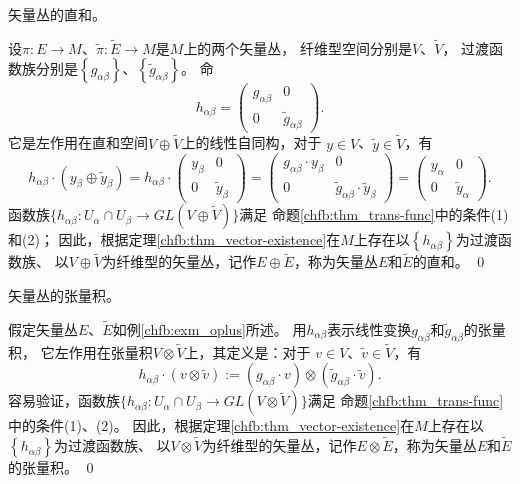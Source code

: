 \begin{example}\label{chfb:exm_oplus}
    矢量丛的直和。
\end{example}
设$\pi: E \rightarrow M$、$\tilde{\pi}: \widetilde{E} \rightarrow M$是$M$上的两个矢量丛，
纤维型空间分别是$V$、$\tilde{V}$，
过渡函数族分别是$\left\{g_{\alpha \beta}\right\}$、$\left\{\tilde{g}_{\alpha \beta}\right\}$。 命
\begin{equation*}
    h_{\alpha \beta}=\begin{pmatrix}
        g_{\alpha \beta} & 0 \\ 0 & \tilde{g}_{\alpha \beta}
    \end{pmatrix}.
\end{equation*}
它是左作用在直和空间$V \oplus \tilde{V}$上的线性自同构，对于 $y \in V$、$ \tilde{y} \in \tilde{V}$，有
\begin{equation*}
    h_{\alpha \beta} \cdot (y_\beta \oplus \tilde{y}_\beta)
    =h_{\alpha \beta} \cdot \begin{pmatrix}
        y_{\beta} & 0 \\ 0 & \tilde{y}_{\beta}
    \end{pmatrix}
    =\begin{pmatrix}
        g_{\alpha \beta}\cdot  y_{\beta} & 0 \\ 0 & \tilde{g}_{\alpha \beta}\cdot  \tilde{y}_{\beta}
    \end{pmatrix}
    =\begin{pmatrix}
        y_{\alpha} & 0 \\ 0 & \tilde{y}_{\alpha}
    \end{pmatrix} .
\end{equation*}
函数族$\{h_{\alpha \beta}: U_\alpha \cap U_\beta \rightarrow GL(V \oplus \tilde{V})\}$满足
命题\ref{chfb:thm_trans-func}中的条件(1)和(2)；
因此，根据定理\ref{chfb:thm_vector-existence}在$M$上存在以$\left\{h_{\alpha \beta}\right\}$为过渡函数族、
以$V\oplus \tilde{V}$为纤维型的矢量丛，记作$E\oplus\widetilde{E}$，称为矢量丛$E$和$\widetilde{E}$的直和。
\qed

\begin{example}\label{chfb:exm_otimes}
    矢量丛的张量积。
\end{example}
假定矢量丛$E$、$\tilde{E}$如例\ref{chfb:exm_oplus}所述。
用$h_{\alpha \beta}$表示线性变换$g_{\alpha \beta}$和$\tilde{g}_{\alpha \beta}$的张量积，
它左作用在张量积$V \otimes \tilde{V}$上，其定义是：对于 $v \in V$、$ \tilde{v} \in \tilde{V}$，有
\begin{equation*}
    h_{\alpha \beta} \cdot(v \otimes \tilde{v})
    :=\left(g_{\alpha \beta} \cdot v\right) \otimes
    \left(\tilde{g}_{\alpha \beta} \cdot \tilde{v}\right) .
\end{equation*}
容易验证，函数族$\{h_{\alpha \beta}: U_\alpha \cap U_\beta \rightarrow GL(V \otimes \tilde{V})\}$满足
命题\ref{chfb:thm_trans-func}中的条件(1)、(2)。
因此，根据定理\ref{chfb:thm_vector-existence}在$M$上存在以$\left\{h_{\alpha \beta}\right\}$为过渡函数族、
以$V\otimes\tilde{V}$为纤维型的矢量丛，记作$E \otimes \tilde{E}$，称为矢量丛$E$和$\tilde{E}$ 的张量积。
\qed

